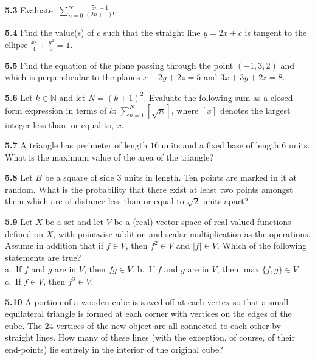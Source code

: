 \documentclass[11pt,a4paper]{article}
\newcommand{\N}{\mathbb{N}}
\newcommand{\qitem}[1]{\par\medskip\noindent\textbf{#1}\hspace{0.5em}}
\begin{document}
\qitem{5.3} Evaluate: $\displaystyle\sum_{n=0}^{\infty} \frac{5n + 1}{(2n + 1)!}$.

\qitem{5.4} Find the value(s) of $c$ such that the straight line $y = 2x + c$ is tangent to the ellipse $\frac{x^2}{4} + \frac{y^2}{9} = 1$.

\qitem{5.5} Find the equation of the plane passing through the point $(-1, 3, 2)$ and which is perpendicular to the planes $x + 2y + 2z = 5$ and $3x + 3y + 2z = 8$.

\qitem{5.6} Let $k \in \N$ and let $N = (k + 1)^2$. Evaluate the following sum as a closed form expression in terms of $k$: $\sum_{n=1}^{N} [\sqrt{n}]$, where $[x]$ denotes the largest integer less than, or equal to, $x$.

\qitem{5.7} A triangle has perimeter of length $16$ units and a fixed base of length $6$ units. What is the maximum value of the area of the triangle?

\qitem{5.8} Let $B$ be a square of side $3$ units in length. Ten points are marked in it at random. What is the probability that there exist at least two points amongst them which are of distance less than or equal to $\sqrt{2}$ units apart?

\qitem{5.9} Let $X$ be a set and let $V$ be a (real) vector space of real-valued functions defined on $X$, with pointwise addition and scalar multiplication as the operations. Assume in addition that if $f \in V$, then $f^2 \in V$ and $|f| \in V$. Which of the following statements are true?\\
a.\ If $f$ and $g$ are in $V$, then $fg \in V$. \qquad b.\ If $f$ and $g$ are in $V$, then $\max\{f, g\} \in V$. \qquad c.\ If $f \in V$, then $f^3 \in V$.

\qitem{5.10} A portion of a wooden cube is sawed off at each vertex so that a small equilateral triangle is formed at each corner with vertices on the edges of the cube. The $24$ vertices of the new object are all connected to each other by straight lines. How many of these lines (with the exception, of course, of their end-points) lie entirely in the interior of the original cube?
\end{document}
